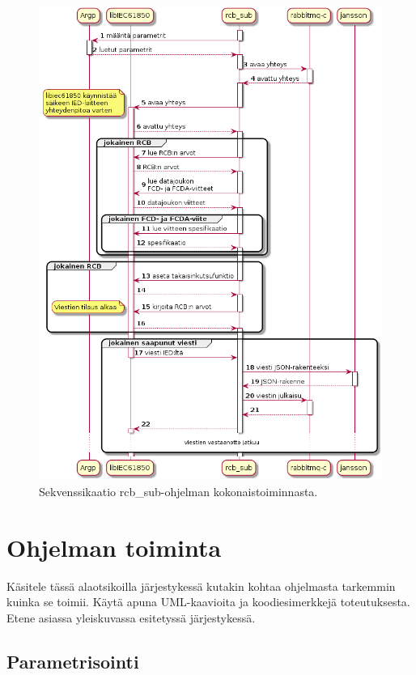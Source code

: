 \begin{figure}[ht!]
	\includegraphics[width=1\textwidth]{pictures/rcb-sub-general-sd.png}
	\caption{Sekvenssikaatio rcb\_sub-ohjelman kokonaistoiminnasta.}
	\label{fig:rcb-sub-sekvenssikaavio}
\end{figure}


\section{Ohjelman toiminta}
\label{rcb-sub-toiminta}
\begin{it}
	Käsitele tässä alaotsikoilla järjestykessä kutakin kohtaa ohjelmasta tarkemmin kuinka se toimii. Käytä apuna UML-kaavioita ja koodiesimerkkejä toteutuksesta. Etene asiassa yleiskuvassa esitetyssä järjestykessä.
\end{it}


\subsection{Parametrisointi}


